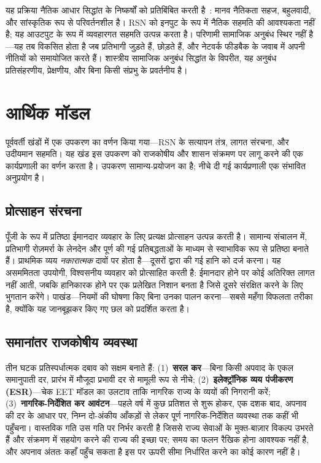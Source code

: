 \documentclass[11pt,a4paper,twocolumn]{article}
\begin{document}
यह प्रक्रिया नैतिक आधार सिद्धांत के निष्कर्षों को प्रतिबिंबित करती है~\cite{haidt2012}: मानव नैतिकता सहज, बहुलवादी, और सांस्कृतिक रूप से परिवर्तनशील है। RSN को इनपुट के रूप में नैतिक सहमति की आवश्यकता नहीं है; यह आउटपुट के रूप में व्यवहारगत सहमति उत्पन्न करता है। परिणामी सामाजिक अनुबंध स्थिर नहीं है---यह तब विकसित होता है जब प्रतिभागी जुड़ते हैं, छोड़ते हैं, और नेटवर्क फीडबैक के जवाब में अपनी नीतियों को समायोजित करते हैं। शास्त्रीय सामाजिक अनुबंध सिद्धांत के विपरीत, यह अनुबंध प्रतिसंहरणीय, प्रेक्षणीय, और बिना किसी संप्रभु के प्रवर्तनीय है।

\section{आर्थिक मॉडल}

पूर्ववर्ती खंडों में एक उपकरण का वर्णन किया गया---RSN के सत्यापन तंत्र, लागत संरचना, और उदीयमान सहमति। यह खंड इस उपकरण को राजकोषीय और शासन संक्रमण पर लागू करने की एक कार्यप्रणाली का वर्णन करता है। उपकरण सामान्य-प्रयोजन का है; नीचे दी गई कार्यप्रणाली एक संभावित अनुप्रयोग है।

\subsection{प्रोत्साहन संरचना}

पूँजी के रूप में प्रतिष्ठा ईमानदार व्यवहार के लिए प्रत्यक्ष प्रोत्साहन उत्पन्न करती है। सामान्य संचालन में, प्रतिभागी रोज़मर्रा के लेनदेन और पूर्ण की गई प्रतिबद्धताओं के माध्यम से स्वाभाविक रूप से प्रतिष्ठा बनाते हैं। प्राथमिक व्यय \emph{नकारात्मक} दावों पर होता है---दूसरों द्वारा की गई हानि को दर्ज करना। यह असममितता उपयोगी, विश्वसनीय व्यवहार को प्रोत्साहित करती है: ईमानदार होने पर कोई अतिरिक्त लागत नहीं आती, जबकि हानिकारक होने पर एक प्रलेखित निशान बनता है जिसे दूसरे संरक्षित करने के लिए भुगतान करेंगे। पाखंड---नियमों की घोषणा किए बिना उनका पालन करना---सबसे महँगा विफलता तरीका है, क्योंकि यह जानबूझकर किए गए छल को प्रदर्शित करता है।

\subsection{समानांतर राजकोषीय व्यवस्था}

तीन घटक प्रतिस्पर्धात्मक दबाव को सक्षम बनाते हैं: (1)~\textbf{सरल कर}---बिना किसी अपवाद के एकल समानुपाती दर, प्रारंभ में मौजूदा प्रभावी दर से मामूली रूप से नीचे; (2)~\textbf{इलेक्ट्रॉनिक व्यय पंजीकरण (ESR)}---चेक EET मॉडल का उलटाव ताकि नागरिक राज्य के व्ययों की निगरानी करें; (3)~\textbf{नागरिक-निर्देशित कर आवंटन}---पहले वर्ष में कुछ प्रतिशत से शुरू होकर, एक दशक बाद, अपनाव की दर के आधार पर, निम्न दो-अंकीय आँकड़ों से लेकर पूर्ण नागरिक-निर्देशित व्यवस्था तक कहीं भी पहुँचना। वास्तविक गति उस गति पर निर्भर करती है जिससे राज्य सेवाओं के मुक्त-बाज़ार विकल्प उभरते हैं और संक्रमण में सहयोग करने की राज्य की इच्छा पर; समय का फलन रैखिक होना आवश्यक नहीं है, और अपनाव अंततः कहाँ पहुँच सकता है इस पर ऊपरी सीमा निर्धारित करने का कोई कारण नहीं है।
\end{document}

